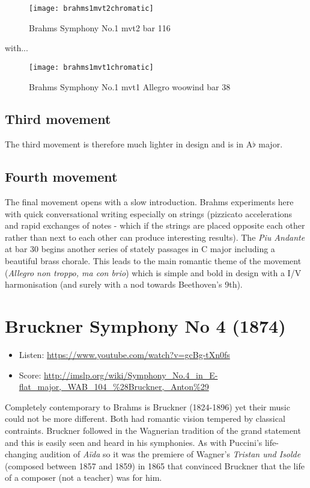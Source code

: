 \begin{figure}[H]
\centering
\texttt{[image: brahms1mvt2chromatic]}\caption{Brahms Symphony No.1 mvt2 bar 116}
\label{fig:b1m2chromatic}
\end{figure}

with...

\begin{figure}[H]
\centering
\texttt{[image: brahms1mvt1chromatic]}\caption{Brahms Symphony No.1 mvt1 Allegro woowind bar 38}
\label{fig:b1m2chromatic}
\end{figure}

\subsection{Third movement}
The third movement is therefore much lighter in design and is in A$\flat$ major.

\subsection{Fourth movement}
The final movement opens with a slow introduction. Brahms experiments here with quick conversational writing especially on strings (pizzicato accelerations and rapid exchanges of notes - which if the strings are placed opposite each other rather than next to each other can produce interesting results). The \textit{Piu Andante} at bar 30 begins another series of stately passages in C major including a beautiful brass chorale. This leads to the main romantic theme of the movement (\textit{Allegro non troppo, ma con brio}) which is simple and bold in design with a I/V harmonisation (and surely with a nod towards Beethoven's 9th).  


\section{Bruckner Symphony No 4 (1874)}
\begin{itemize}
\item Listen: \url{https://www.youtube.com/watch?v=gcBg-tXn0fs}
\item Score: \url{http://imslp.org/wiki/Symphony_No.4_in_E-flat_major,_WAB_104_%28Bruckner,_Anton%29}
\end{itemize}

Completely contemporary to Brahms is Bruckner (1824-1896) yet their music could not be more different. Both had romantic vision tempered by classical contraints. Bruckner followed in the Wagnerian tradition of the grand statement and this is easily seen and heard in his symphonies. As with Puccini's life-changing audition of \textit{A\"ida} so it was the premiere of Wagner's \textit{Tristan und Isolde} (composed between 1857 and 1859) in 1865 that convinced Bruckner that the life of a composer (not a teacher) was for him. 

